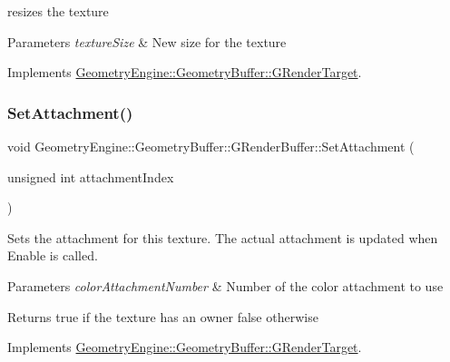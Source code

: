 resizes the texture 
\begin{DoxyParams}{Parameters}
{\em texture\+Size} & New size for the texture \\
\hline
\end{DoxyParams}


Implements \mbox{\hyperlink{class_geometry_engine_1_1_geometry_buffer_1_1_g_render_target_ac1e54f456408b53de44fe10116d649dd}{Geometry\+Engine\+::\+Geometry\+Buffer\+::\+G\+Render\+Target}}.

\mbox{\label{class_geometry_engine_1_1_geometry_buffer_1_1_g_render_buffer_adb0c62f7d9fb1d61b3ea84bc026fa539}} 
\subsubsection{\texorpdfstring{SetAttachment()}{SetAttachment()}\hspace{0.1cm}{\footnotesize\ttfamily [1/2]}}
{\footnotesize\ttfamily void Geometry\+Engine\+::\+Geometry\+Buffer\+::\+G\+Render\+Buffer\+::\+Set\+Attachment (\begin{DoxyParamCaption}\item[{unsigned int}]{attachment\+Index }\end{DoxyParamCaption})\hspace{0.3cm}{\ttfamily [virtual]}}

Sets the attachment for this texture. The actual attachment is updated when Enable is called. 
\begin{DoxyParams}{Parameters}
{\em color\+Attachment\+Number} & Number of the color attachment to use \\
\hline
\end{DoxyParams}
\begin{DoxyReturn}{Returns}
true if the texture has an owner false otherwise 
\end{DoxyReturn}


Implements \mbox{\hyperlink{class_geometry_engine_1_1_geometry_buffer_1_1_g_render_target_a1031c44ad374654e2183d3b1b99638a3}{Geometry\+Engine\+::\+Geometry\+Buffer\+::\+G\+Render\+Target}}.

\mbox{\label{class_geometry_engine_1_1_geometry_buffer_1_1_g_render_buffer_ae69412d2730060177ad8479a6a4d313c}} 
